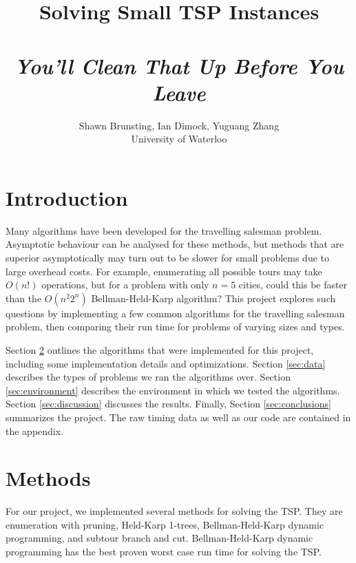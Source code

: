 \documentclass[11pt]{article}
\begin{document}
	
	\thispagestyle{empty}
	
	\title{Solving Small TSP Instances \\ ~ \\ \textit{You'll Clean That Up Before You Leave}}
	
	\author{Shawn Brunsting, Ian Dimock, Yuguang Zhang \\ University of Waterloo}
	
	\maketitle
	
	
	\section{Introduction}
	
	Many algorithms have been developed for the travelling salesman problem. Asymptotic behaviour can be analysed for these methods, but methods that are superior asymptotically may turn out to be slower for small problems due to large overhead costs. For example, enumerating all possible tours may take $O(n!)$ operations, but for a problem with only $n=5$ cities, could this be faster than the $O(n^2 2^n)$ Bellman-Held-Karp algorithm? This project explores such questions by implementing a few common algorithms for the travelling salesman problem, then comparing their run time for problems of varying sizes and types.
	
	Section \ref{sec:methods} outlines the algorithms that were implemented for this project, including some implementation details and optimizations. Section \ref{sec:data} describes the types of problems we ran the algorithms over. Section \ref{sec:environment} describes the environment in which we tested the algorithms. Section \ref{sec:discussion} discusses the results. Finally, Section \ref{sec:conclusions} summarizes the project. The raw timing data as well as our code are contained in the appendix.
	
	\section{Methods}
	\label{sec:methods}
	For our project, we implemented several methods for solving the TSP. They are enumeration with pruning, Held-Karp 1-trees, Bellman-Held-Karp dynamic programming, and subtour branch and cut. Bellman-Held-Karp dynamic programming has the best proven worst case run time for solving the TSP. 
\end{document}
